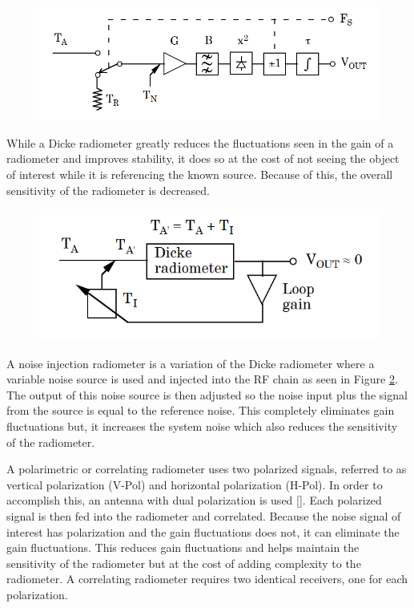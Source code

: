 {\begin{figure}[h!tb] 
\centering
\includegraphics[width=\textwidth]{Images/Dicke_block.png}
\label{dicke_radiometer}
\end{figure}
}

While a Dicke radiometer greatly reduces the fluctuations seen in the gain of a radiometer and improves stability, it does so at the cost of not seeing the object of interest while it is referencing the known source.  Because of this, the overall sensitivity of the radiometer is decreased.

{\begin{figure}[h!tb] 
\centering
\includegraphics[width=\textwidth]{Images/NoiseInj_block.png}
\label{NoiseInj_radiometer}
\end{figure}
}

A noise injection radiometer is a variation of the Dicke radiometer where a variable noise source is used and injected into the RF chain as seen in Figure \ref{NoiseInj_radiometer}.  The output of this noise source is then adjusted so the noise input plus the signal from the source is equal to the reference noise.  This completely eliminates gain fluctuations but, it increases the system noise which also reduces the sensitivity of the radiometer.

A polarimetric or correlating radiometer uses two polarized signals, referred to as vertical polarization (V-Pol) and horizontal polarization (H-Pol).  In order to accomplish this, an antenna with dual polarization is used [\cite{Fujimoto}].  Each polarized signal is then fed into the radiometer and correlated.  Because the noise signal of interest has polarization and the gain fluctuations does not, it can eliminate the gain fluctuations.  This reduces gain fluctuations and helps maintain the sensitivity of the radiometer but at the cost of adding complexity to the radiometer. A correlating radiometer requires two identical receivers, one for each polarization. 


